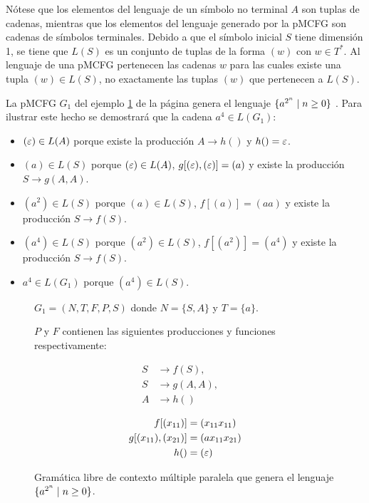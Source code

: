 Nótese que los elementos del lenguaje de un símbolo no terminal $A$ son tuplas de cadenas, mientras que los elementos del lenguaje generado por la pMCFG son cadenas de símbolos terminales. Debido a que el símbolo inicial $S$ tiene dimensión 1, se tiene que $L(S)$ es un conjunto de tuplas de la forma $(w)$ con $w \in T^*$. Al lenguaje de una pMCFG pertenecen las cadenas $w$ para las cuales existe una tupla $(w) \in L(S)$, no exactamente las tuplas $(w)$ que pertenecen a $L(S)$.

La pMCFG $G_1$ del ejemplo \ref{fig:pmcfg-example} de la página \pageref{fig:pmcfg-example} genera el lenguaje $\{a^{2^n} \;|\; n \geq 0\}$ \cite{Seki1991OnMC}. Para ilustrar este hecho se demostrará que la cadena $a^4 \in L(G_1)$:

\begin{itemize}
    \item $(\varepsilon) \in L(A)$ porque existe la producción $A \to h()$ y $h() = \varepsilon$.
    \item $(a) \in L(S)$ porque $(\varepsilon) \in L(A)$, $g[(\varepsilon), (\varepsilon)] = (a)$ y existe la producción $S \to g(A, A)$.
    \item $(a^2) \in L(S)$ porque $(a) \in L(S)$, $f[(a)] = (aa)$ y existe la producción $S \to f(S)$.
    \item $(a^4) \in L(S)$ porque $(a^2) \in L(S)$, $f[(a^2)] = (a^4)$ y existe la producción $S \to f(S)$.
    \item $a^4 \in L(G_1)$ porque $(a^4) \in L(S)$.
\end{itemize}


\begin{figure}[h]
    \centering
    $G_1 = (N,T,F,P,S)$ donde $N = \{S,A\}$ y $T = \{a\}$.

    $P$ y $F$ contienen las siguientes producciones y funciones respectivamente:

    \begin{minipage}{0.45\textwidth}
        \begin{align*}
            S & \to f(S), \quad   \\
            S & \to g(A,A), \quad \\
            A & \to h()
        \end{align*}
    \end{minipage}
    \hfill
    \begin{minipage}{0.45\textwidth}
        \begin{align*}
            f[(x_{11})]          & = (x_{11}x_{11})  \\
            g[(x_{11}),(x_{21})] & = (ax_{11}x_{21}) \\
            h()                  & = (\varepsilon)
        \end{align*}
    \end{minipage}
    \caption{Gramática libre de contexto múltiple paralela que genera el lenguaje $\{a^{2^n} \;|\; n \geq 0\}$.}
    \label{fig:pmcfg-example}
\end{figure}

